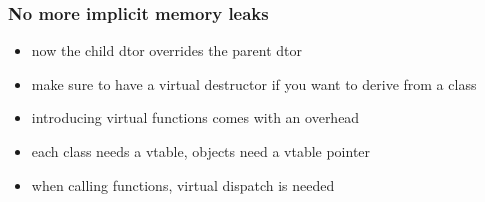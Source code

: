 \begin{frame}[fragile]
    \frametitle{No more implicit memory leaks}
    \begin{itemize}
    \begin{lstlisting}[numbers=none]
class Parent {
public:
    virtual ~Parent() = default;
};
class Child : public Parent {};
Parent* p = new Child();
delete p;
    \end{lstlisting}
    \item now the child dtor overrides the parent dtor
    \item make sure to have a virtual destructor if you want to derive from a class
    \item introducing virtual functions comes with an overhead
    \item each class needs a vtable, objects need a vtable pointer
    \item when calling functions, virtual dispatch is needed
    \end{itemize}
\end{frame}


